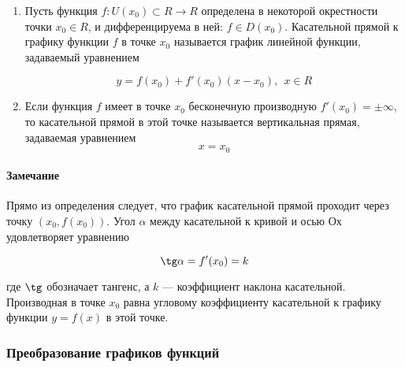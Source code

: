 \documentclass{article}
\begin{document}
\begin{enumerate}
    \item Пусть функция $f: U(x_0) \subset R \rightarrow R$ определена в некоторой окрестности точки $x_0 \in R$, и дифференцируема в ней: $f \in D(x_0)$. Касательной прямой к графику функции $f$ в точке $x_0$ называется график линейной функции, задаваемый уравнением

    $$y = f(x_0) + f'(x_0)(x - x_0), \ \ x \in R$$
    \item Если функция $f$ имеет в точке $x_0$ бесконечную производную $f'(x_0) = \pm \infty$, то касательной прямой в этой точке называется вертикальная прямая, задаваемая уравнением
    $$x = x_0$$
\end{enumerate}

\paragraph{Замечание}

Прямо из определения следует, что график касательной прямой проходит через точку $(x_0, f(x_0))$. Угол $\alpha$ между касательной к кривой и осью Ох удовлетворяет уравнению

$$\tg \alpha = f'(x_0) = k$$

где $\tg$ обозначает тангенс, а $k$ — коэффициент наклона касательной. Производная в точке $x_0$ равна угловому коэффициенту касательной к графику функции $y = f (x)$ в этой точке. 

\subsubsection{Преобразование графиков функций}
\end{document}
